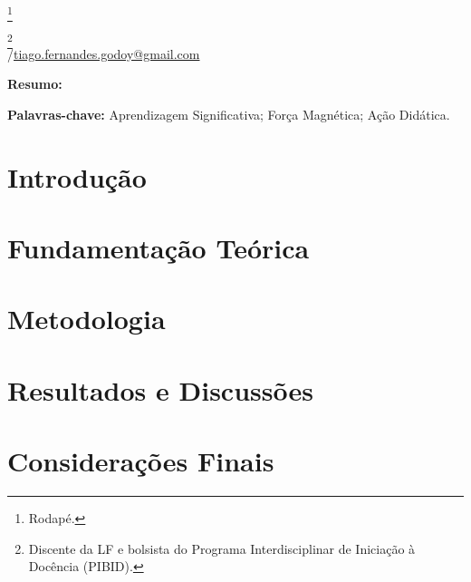 \documentclass[12pt, openright, sumario=tradicional, a4paper, oneside, article, english, brazil] {abntex2}
\begin{document}
\pagestyle{fancy}

\begin{center}
	\begin{SingleSpace}
		\imprimirtitulo\footnote{Rodapé.}
		\vspace{\onelineskip}
	
		\imprimirautor\footnote{Discente da LF e bolsista do Programa Interdisciplinar de Iniciação à Docência (PIBID).} \\
		\imprimirinstituicao/\href{e-mail: tiago.fernandes.godoy@gmail.com}{tiago.fernandes.godoy@gmail.com}
	\end{SingleSpace}
\end{center}

\begin{SingleSpace}
	\noindent
	\small\textbf{Resumo:} \lipsum[1]
	\vspace{\onelineskip}
	
	\noindent
	\textbf{Palavras-chave:} Aprendizagem Significativa; Força Magnética; Ação Didática.
\end{SingleSpace}

\section{Introdução}

\lipsum[1-3]

\section{Fundamentação Teórica}

\lipsum[4-6]

\section{Metodologia}

\lipsum[7-9]

\section{Resultados e Discussões}

\lipsum[10-12]

\section{Considerações Finais}

\lipsum[13-15]

\newpage

	
\end{document}
